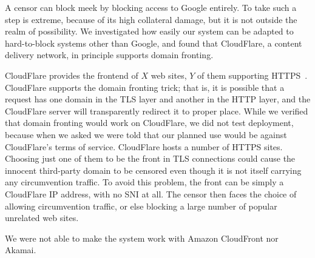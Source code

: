 \documentclass{article}
\begin{document}
A censor can block meek by blocking access to Google entirely.
To take such a step is extreme, because of its high collateral damage,
but it is not outside the realm of possibility.
We investigated how easily our system can be adapted to hard-to-block systems other than Google,
and found that CloudFlare, a content delivery network, in principle supports domain fronting.

CloudFlare provides the frontend of $X$ web sites, $Y$ of them supporting HTTPS~\cite{something}.
CloudFlare supports the domain fronting trick;
that is, it is possible that a request has one domain in the TLS layer
and another in the HTTP layer, and the CloudFlare server will transparently redirect it to proper place.
While we verified that domain fronting would work on CloudFlare,
we did not test deployment,
because when we asked we were told that our planned use would be against CloudFlare's terms of service.
CloudFlare hosts a number of HTTPS sites.
Choosing just one of them to be the front in TLS connections could cause
the innocent third-party domain to be censored even though it is not itself carrying any circumvention traffic.
To avoid this problem, the front can be simply a CloudFlare IP address,
with no SNI at all.
The censor then faces the choice of allowing circumvention traffic,
or else blocking a large number of popular unrelated web sites.

We were not able to make the system work with Amazon CloudFront nor Akamai.



  

\end{document}
